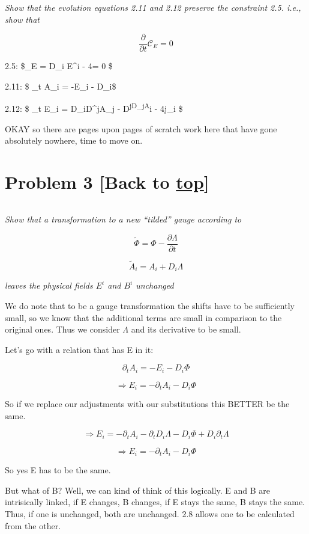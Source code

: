 \documentclass[landscape,letterpaper,10pt,english]{article}
\begin{document}
\emph{Show that the evolution equations 2.11 and 2.12 preserve the
constraint 2.5. i.e., show that}

\[ \frac{\partial}{\partial t} \mathcal{C}_E = 0 \]

    2.5: \$\_E = D\_i E\^{}i - 4\pi \rho = 0 \$

2.11: \$ \partial\_t A\_i = -E\_i - D\_i\Phi \$

2.12: \$ \partial\_t E\_i = D\_iD\^{}jA\_j - D\textsuperscript{jD\_jA}i
- 4\pi j\_i \$

    OKAY so there are pages upon pages of scratch work here that have gone
absolutely nowhere, time to move on.

    \hypertarget{problem-3-back-to-top}{%
\section{\texorpdfstring{Problem 3 {[}Back to
\hyperref[toc]{top}{]}}{Problem 3 {[}Back to {]}}}\label{problem-3-back-to-top}}

\[\label{P3}\]

\emph{Show that a transformation to a new ``tilded'' gauge according to}

\[ \tilde\Phi = \Phi - \frac{\partial \Lambda}{\partial t} \]

\[ \tilde{A}_i = A_i + D_i \Lambda \]

\emph{leaves the physical fields \(E^i\) and \(B^i\) unchanged}

We do note that to be a gauge transformation the shifts have to be
sufficiently small, so we know that the additional terms are small in
comparison to the original ones. Thus we consider \(\Lambda\) and its
derivative to be small.

    Let's go with a relation that has E in it:

\[ \partial_t A_i = -E_i -D_i \Phi \]

\[ \Rightarrow E_i = - \partial_t A_i -D_i \Phi \]

So if we replace our adjustments with our substitutions this BETTER be
the same.

\[ \Rightarrow E_i = - \partial_t A_i - \partial_t D_i \Lambda - D_i \Phi + D_i \partial_t \Lambda \]

\[ \Rightarrow E_i = - \partial_t A_i- D_i \Phi \]

So yes E has to be the same.

    But what of B? Well, we can kind of think of this logically. E and B are
intrisically linked, if E changes, B changes, if E stays the same, B
stays the same. Thus, if one is unchanged, both are unchanged. 2.8
allows one to be calculated from the other.
\end{document}

